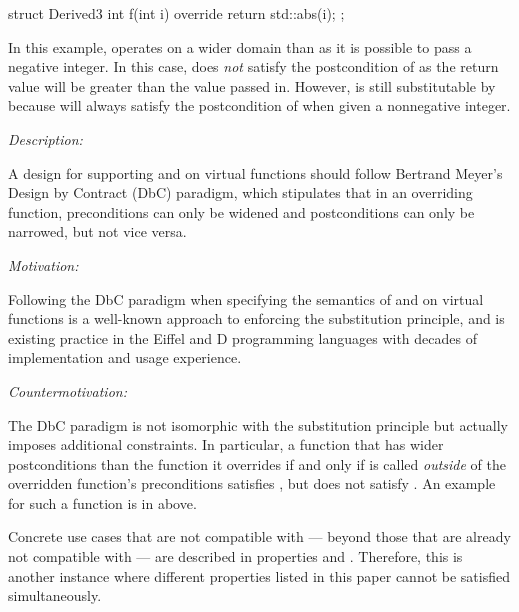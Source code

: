 \begin{codeblock}
struct Derived3 {
  int f(int i) override {
    return std::abs(i);
  }
};
\end{codeblock}
In this example,  operates on a wider domain than  as it is possible to pass a negative integer. In this case,   does \emph{not} satisfy the postcondition of  as the return value will be greater than the value passed in. However,  is still substitutable by  because  will always satisfy the postcondition of  when given a nonnegative integer.


\emph{Description:}

A design for supporting  and  on virtual functions should follow Bertrand Meyer's Design by Contract (DbC) paradigm, which stipulates that in an overriding function, preconditions can only be widened and postconditions can only be narrowed, but not vice versa.

\emph{Motivation:}

Following the DbC paradigm when  specifying the semantics of  and  on virtual functions is a well-known approach to enforcing the substitution principle, and is existing practice in the Eiffel and D programming languages with decades of implementation and usage experience.

\emph{Countermotivation:} 

The DbC paradigm is not isomorphic with the substitution principle but actually imposes additional constraints. In particular, a function that has wider postconditions than the function it overrides if and only if is called \emph{outside} of the overridden function's preconditions satisfies , but does not satisfy . An example for such a function is  in  above.

Concrete use cases that are not compatible with  --- beyond those that are already not compatible with  --- are described in properties  and . Therefore, this is another instance where different properties listed in this paper cannot be satisfied simultaneously. %


